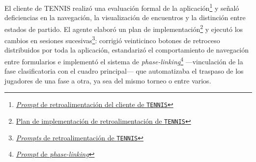 El cliente de \ac{TENNIS} realizó una evaluación formal de la aplicación\footnote{\href{https://github.com/alu0101549491/TFG-Fabian-Gonzalez-Lence/blob/main/resources/prompts/5-TennisTournamentManager/6-FeedbackDeLaAplicacion/client-feedback.prompt.md}{\textit{Prompt} de retroalimentación del cliente de \texttt{TENNIS}}} y señaló deficiencias en la navegación, la visualización de encuentros y la distinción entre estados de partido. El agente elaboró un plan de implementación\footnote{\href{https://github.com/alu0101549491/TFG-Fabian-Gonzalez-Lence/blob/main/projects/5-TennisTournamentManager/docs/FEEDBACK-IMPLEMENTATION-PLAN.md}{Plan de implementación de retroalimentación de \texttt{TENNIS}}} y ejecutó los cambios en sesiones sucesivas\footnote{\href{https://github.com/alu0101549491/TFG-Fabian-Gonzalez-Lence/tree/main/resources/prompts/5-TennisTournamentManager/6-FeedbackDeLaAplicacion}{\textit{Prompts} de retroalimentación de \texttt{TENNIS}}}: corrigió veinticinco botones de retroceso distribuidos por toda la aplicación, estandarizó el comportamiento de navegación entre formularios e implementó el sistema de \textit{phase-linking}\footnote{\href{https://github.com/alu0101549491/TFG-Fabian-Gonzalez-Lence/blob/main/resources/prompts/5-TennisTournamentManager/6-FeedbackDeLaAplicacion/phase-linking.prompt.md}{\textit{Prompt} de \textit{phase-linking}}} ---vinculación de la fase clasificatoria con el cuadro principal--- que automatizaba el traspaso de los jugadores de una fase a otra, ya sea del mismo torneo o entre varios.
